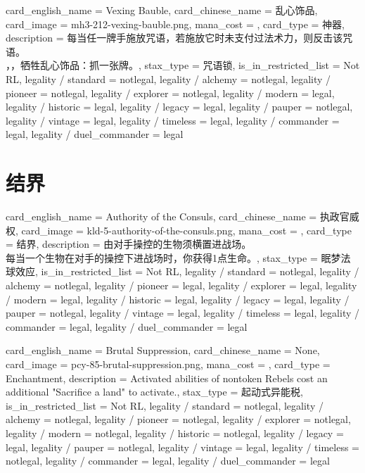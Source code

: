\documentclass[lang = cn, color = black, 10pt]{AllThatStax}
\begin{document}
\card
{
	card_english_name = {Vexing Bauble},
	card_chinese_name = {乱心饰品},
	card_image = mh3-212-vexing-bauble.png,
	mana_cost = ,
	card_type = 神器,
	description = {每当任一牌手施放咒语，若施放它时未支付过法术力，则反击该咒语。\\
		，，牺牲乱心饰品：抓一张牌。},
	stax_type = 咒语锁,
	is_in_restricted_list = Not RL,
	legality / standard = notlegal,
	legality / alchemy = notlegal,
	legality / pioneer = notlegal,
	legality / explorer = notlegal,
	legality / modern = legal,
	legality / historic = legal,
	legality / legacy = legal,
	legality / pauper = notlegal,
	legality / vintage = legal,
	legality / timeless = legal,
	legality / commander = legal,
	legality / duel_commander = legal
}

\section{结界}

\card
{
	card_english_name = {Authority of the Consuls},
	card_chinese_name = {执政官威权},
	card_image = kld-5-authority-of-the-consuls.png,
	mana_cost = ,
	card_type = 结界,
	description = {由对手操控的生物须横置进战场。\\
		每当一个生物在对手的操控下进战场时，你获得1点生命。},
	stax_type = 眠梦法球效应,
	is_in_restricted_list = Not RL,
	legality / standard = notlegal,
	legality / alchemy = notlegal,
	legality / pioneer = legal,
	legality / explorer = legal,
	legality / modern = legal,
	legality / historic = legal,
	legality / legacy = legal,
	legality / pauper = notlegal,
	legality / vintage = legal,
	legality / timeless = legal,
	legality / commander = legal,
	legality / duel_commander = legal
}

\card
{
	card_english_name = {Brutal Suppression},
	card_chinese_name = {None},
	card_image = pcy-85-brutal-suppression.png,
	mana_cost = ,
	card_type = Enchantment,
	description = {Activated abilities of nontoken Rebels cost an additional "Sacrifice a land" to activate.},
	stax_type = 起动式异能税,
	is_in_restricted_list = Not RL,
	legality / standard = notlegal,
	legality / alchemy = notlegal,
	legality / pioneer = notlegal,
	legality / explorer = notlegal,
	legality / modern = notlegal,
	legality / historic = notlegal,
	legality / legacy = legal,
	legality / pauper = notlegal,
	legality / vintage = legal,
	legality / timeless = notlegal,
	legality / commander = legal,
	legality / duel_commander = legal
}
\end{document}
